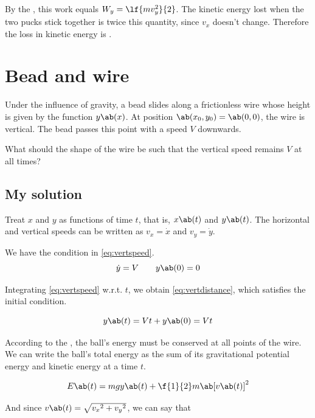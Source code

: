 By the , this work equals \(W_y =
\lf{mv_y^2}{2}\). The kinetic energy lost when the two pucks stick
together is twice this quantity, since \(v_x\) doesn't change.
Therefore the loss in kinetic energy is .

\section{Bead and wire}
\label{sec:bead_and_wire}

\begin{problem}
Under the influence of gravity, a bead slides along a frictionless
wire whose height is given by the function \(y\ab(x)\). At position
\(\ab(x_0, y_0) = \ab(0,0)\), the wire is vertical. The bead passes
this point with a speed \(V\) downwards.

What should the shape of the wire be such that the vertical speed
remains \(V\) at all times?
\end{problem}

\subsection{My solution}
Treat \(x\) and \(y\) as functions of time \(t\), that is,
\(x\ab(t)\) and \(y\ab(t)\). The horizontal and vertical speeds can
be written as \(v_x = \dot{x}\) and \(v_y = \dot{y}\).

We have the condition in \cref{eq:vertspeed}.
\begin{equation}
	\dot{y} = V\qquad y\ab(0) = 0
	\label{eq:vertspeed}
\end{equation}

Integrating \cref{eq:vertspeed} w.r.t. \(t\), we obtain \cref{eq:vertdistance},
which satisfies the initial condition.

\begin{equation}
	y\ab(t) = Vt + y\ab(0) = Vt
	\label{eq:vertdistance}
\end{equation}

According to the , the ball's
energy must be conserved at all points of the wire. We can write the
ball's total energy as the sum of its gravitational potential energy
and kinetic energy at a time \(t\).

\begin{equation*}
	E\ab(t) = mgy\ab(t) + \f{1}{2}m\ab[v\ab(t)]^2
\end{equation*}

And since \(v\ab(t) = \sqrt{{v_x}^2 + {v_y}^2}\), we can say that

